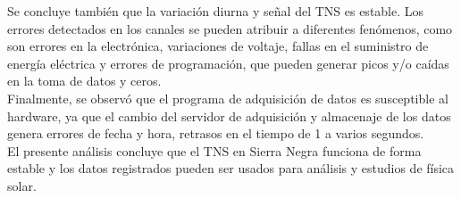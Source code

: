 Se concluye también que la variación diurna y señal del TNS es estable. Los errores detectados en los canales se pueden atribuir a diferentes fenómenos, como son errores en la electrónica, variaciones de voltaje, fallas en el suministro de energía eléctrica y errores de programación, que pueden generar picos y/o caídas en la toma de datos y ceros.\\

Finalmente, se observó que el programa de adquisición de datos es susceptible al hardware, ya que el cambio del servidor de adquisición y almacenaje de los datos genera errores de fecha y hora, retrasos en el tiempo de 1 a varios segundos.\\

El presente análisis concluye que el TNS en Sierra Negra funciona de forma estable y los datos registrados pueden ser usados para análisis y estudios de física solar.

